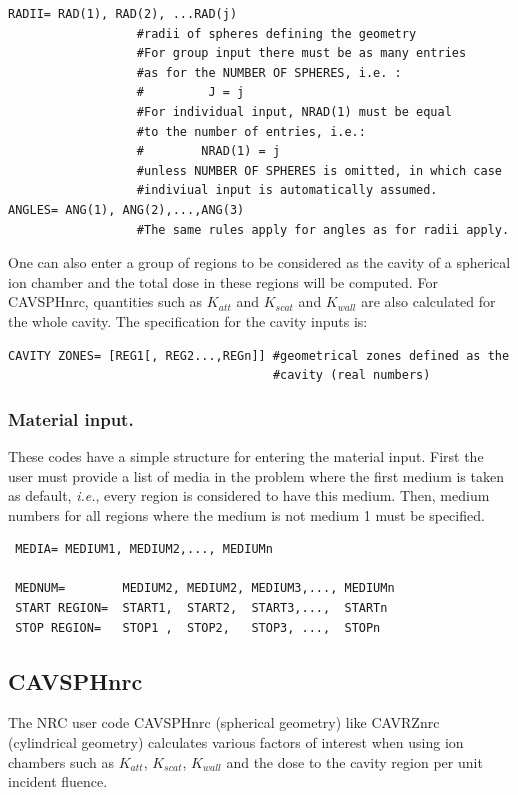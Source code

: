 \documentclass[12pt,twoside]{article}  %
\newcommand{\ie}{{\em i.e.}}
\begin{document}
\begin{verbatim}
RADII= RAD(1), RAD(2), ...RAD(j)  
                  #radii of spheres defining the geometry
                  #For group input there must be as many entries
                  #as for the NUMBER OF SPHERES, i.e. :
                  #         J = j
                  #For individual input, NRAD(1) must be equal
                  #to the number of entries, i.e.:
                  #        NRAD(1) = j
                  #unless NUMBER OF SPHERES is omitted, in which case
                  #indiviual input is automatically assumed.
ANGLES= ANG(1), ANG(2),...,ANG(3)
                  #The same rules apply for angles as for radii apply.
\end{verbatim}

One can also enter a group of regions to be considered as the cavity
of a spherical ion chamber and the total dose in these regions will
be computed. For CAVSPHnrc, quantities such as
$K_{att}$ and $K_{scat}$ and $K_{wall}$ are also calculated for the
whole cavity. The specification for the cavity inputs is:
\begin{verbatim}
CAVITY ZONES= [REG1[, REG2...,REGn]] #geometrical zones defined as the
                                     #cavity (real numbers)
\end{verbatim}

\subsubsection{Material input.}

These codes have a simple structure for entering the material input. First
the user must provide a list of media in the problem where the first
medium is taken as default, \ie, every region is considered to have this
medium. Then, medium numbers for all regions where the medium is not 
medium 1 must be specified.


\begin{verbatim}
 MEDIA= MEDIUM1, MEDIUM2,..., MEDIUMn
        
 MEDNUM=        MEDIUM2, MEDIUM2, MEDIUM3,..., MEDIUMn
 START REGION=  START1,  START2,  START3,...,  STARTn
 STOP REGION=   STOP1 ,  STOP2,   STOP3, ...,  STOPn

\end{verbatim}

\subsection{CAVSPHnrc}
The NRC user code CAVSPHnrc (spherical geometry) like CAVRZnrc
(cylindrical geometry) calculates various factors of interest when using
ion chambers such as $K_{att}$, $K_{scat}$, $K_{wall}$ and the dose to the
cavity region per unit incident fluence. 
\end{document}
